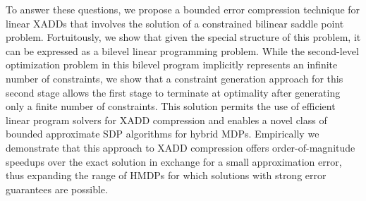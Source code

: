To answer these questions, we propose a bounded error compression
technique for linear XADDs that involves the solution of a constrained
bilinear saddle point problem.  Fortuitously, we show that given the
special structure of this problem, it can be expressed as a bilevel
linear programming problem. %
While the second-level optimization problem in this
bilevel program implicitly represents an infinite number of
constraints, we show that a constraint generation approach for 
this second stage allows the first stage to terminate at
optimality after generating only a finite number of constraints.  This
solution permits the use of efficient linear program solvers for XADD
compression and enables a novel class of bounded approximate SDP
algorithms for hybrid MDPs.  Empirically we demonstrate that this
approach to XADD compression offers order-of-magnitude speedups over
the exact solution in exchange for a small approximation error, thus
expanding the range of HMDPs for which solutions with strong
error guarantees are possible.

